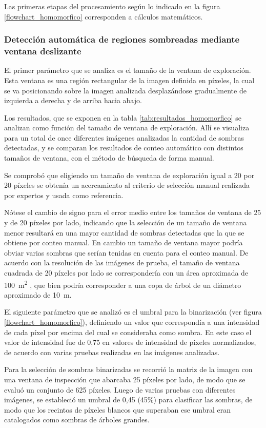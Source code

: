 Las primeras etapas del procesamiento según lo indicado en la figura \ref{flowchart_homomorfico} corresponden a cálculos matemáticos.
\subsubsection{Detección automática de regiones sombreadas mediante ventana deslizante} \label{resultados homo ventana}
El primer parámetro que se analiza es el tamaño de la ventana de exploración. Esta ventana es una región rectangular de la imagen definida en píxeles, la cual se va posicionando sobre la imagen analizada desplazándose gradualmente de izquierda a derecha y de arriba hacia abajo.

 Los resultados, que se exponen en la tabla \ref{tab:resultados_homomorfico} se analizan como función del tamaño de ventana de exploración.
Allí se visualiza para un total de once diferentes imágenes analizadas la cantidad de sombras detectadas, y se comparan los resultados de conteo automático con distintos tamaños de ventana, con el método de búsqueda de forma manual.

Se comprobó que eligiendo un tamaño de ventana de exploración igual a 20 por 20 píxeles se obtenía un acercamiento al criterio de selección manual realizada por expertos y usada como referencia.

Nótese el cambio de signo para el error medio entre los tamaños de ventana de 25 y de 20 píxeles por lado, indicando que la selección de un tamaño de ventana menor resultará en una mayor cantidad de sombras detectadas que la que se obtiene por conteo manual. En cambio un tamaño de ventana mayor podría obviar varias sombras que serían tenidas en cuenta para el conteo manual. De acuerdo con la resolución de las imágenes de prueba, el tamaño de ventana cuadrada de 20 píxeles por lado se correspondería con un área aproximada de \SI{100}{\metre\squared} , que bien podría corresponder a una copa de árbol de un diámetro aproximado de \SI{10}{\metre}.

El siguiente parámetro que se analizó es el umbral para la binarización (ver figura \ref{flowchart_homomorfico}), definiendo un valor que correspondía a una intensidad de cada píxel por encima del cual se consideraba como sombra. En este caso el valor de intensidad fue de 0,75 en valores de intensidad de píxeles normalizados, de acuerdo con varias pruebas realizadas en las imágenes analizadas.

Para la selección de sombras binarizadas se recorrió la matriz de la imagen con una ventana de inspección que abarcaba 25 píxeles por lado, de modo que se evaluó un conjunto de 625 píxeles. Luego de varias pruebas con diferentes imágenes, se estableció un umbral de 0,45 (45\%) para clasificar las sombras, de modo que los recintos de píxeles blancos que superaban ese umbral eran catalogados como sombras de árboles grandes.

